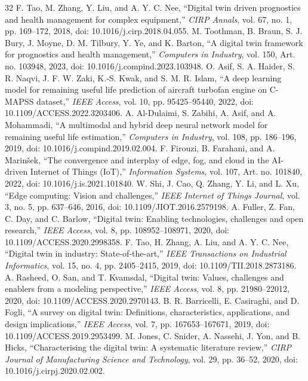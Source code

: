 ﻿\documentclass[conference]{IEEEtran}
\begin{document}
\begin{thebibliography}{32}
 F. Tao, M. Zhang, Y. Liu, and A. Y. C. Nee, ``Digital twin driven prognostics and health management for complex equipment,'' \emph{CIRP Annals}, vol. 67, no. 1, pp. 169--172, 2018, doi: 10.1016/j.cirp.2018.04.055.
 M. Toothman, B. Braun, S. J. Bury, J. Moyne, D. M. Tilbury, Y. Ye, and K. Barton, ``A digital twin framework for prognostics and health management,'' \emph{Computers in Industry}, vol. 150, Art. no. 103948, 2023, doi: 10.1016/j.compind.2023.103948.
 O. Asif, S. A. Haider, S. R. Naqvi, J. F. W. Zaki, K.-S. Kwak, and S. M. R. Islam, ``A deep learning model for remaining useful life prediction of aircraft turbofan engine on C-MAPSS dataset,'' \emph{IEEE Access}, vol. 10, pp. 95425--95440, 2022, doi: 10.1109/ACCESS.2022.3203406.
 A. Al-Dulaimi, S. Zabihi, A. Asif, and A. Mohammadi, ``A multimodal and hybrid deep neural network model for remaining useful life estimation,'' \emph{Computers in Industry}, vol. 108, pp. 186--196, 2019, doi: 10.1016/j.compind.2019.02.004.
 F. Firouzi, B. Farahani, and A. Marin\v{s}ek, ``The convergence and interplay of edge, fog, and cloud in the AI-driven Internet of Things (IoT),'' \emph{Information Systems}, vol. 107, Art. no. 101840, 2022, doi: 10.1016/j.is.2021.101840.
 W. Shi, J. Cao, Q. Zhang, Y. Li, and L. Xu, ``Edge computing: Vision and challenges,'' \emph{IEEE Internet of Things Journal}, vol. 3, no. 5, pp. 637--646, 2016, doi: 10.1109/JIOT.2016.2579198.
 A. Fuller, Z. Fan, C. Day, and C. Barlow, ``Digital twin: Enabling technologies, challenges and open research,'' \emph{IEEE Access}, vol. 8, pp. 108952--108971, 2020, doi: 10.1109/ACCESS.2020.2998358.
 F. Tao, H. Zhang, A. Liu, and A. Y. C. Nee, ``Digital twin in industry: State-of-the-art,'' \emph{IEEE Transactions on Industrial Informatics}, vol. 15, no. 4, pp. 2405--2415, 2019, doi: 10.1109/TII.2018.2873186.
 A. Rasheed, O. San, and T. Kvamsdal, ``Digital twin: Values, challenges and enablers from a modeling perspective,'' \emph{IEEE Access}, vol. 8, pp. 21980--22012, 2020, doi: 10.1109/ACCESS.2020.2970143.
 B. R. Barricelli, E. Casiraghi, and D. Fogli, ``A survey on digital twin: Definitions, characteristics, applications, and design implications,'' \emph{IEEE Access}, vol. 7, pp. 167653--167671, 2019, doi: 10.1109/ACCESS.2019.2953499.
 M. Jones, C. Snider, A. Nassehi, J. Yon, and B. Hicks, ``Characterising the digital twin: A systematic literature review,'' \emph{CIRP Journal of Manufacturing Science and Technology}, vol. 29, pp. 36--52, 2020, doi: 10.1016/j.cirpj.2020.02.002.

\end{thebibliography}
\end{document}
